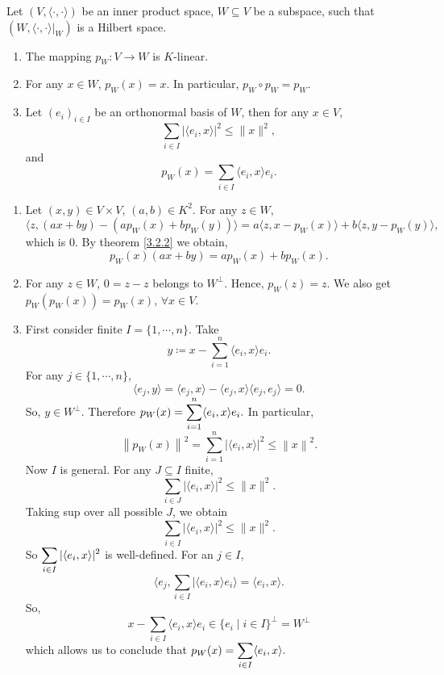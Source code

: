 \begin{propositionenv}[Parseval]\label{prop:3.2.7}
    Let $\left(V,\langle \cdot, \cdot\rangle\right)$ be an inner product space, $W\subseteq V$ be a subspace, such that $\left(W,\langle\cdot,\cdot\rangle|_W\right)$ is a Hilbert space.
    \begin{enumerate}
        \item The mapping $p_W : V\rightarrow W$ is $K$-linear.
        \item For any $x\in W$, $p_W(x) = x$. In particular, $p_W\circ p_W = p_W$.
        \item Let $\left(e_i\right)_{i\in I}$ be an orthonormal basis of $W$, then for any $x\in V$,
        $$ \sum_{i\in I} |\langle e_i, x\rangle|^2 \le \| x\|^2,$$
        and 
        $$ p_W(x) = \sum_{i\in I} \langle e_i, x\rangle e_i.$$
    \end{enumerate}
\end{propositionenv}
\begin{proofenv}
    \quad
    \begin{enumerate}
        \item Let $(x,y)\in V\times V$, $(a,b)\in K^2$. For any $z\in W$,
        $$ \langle z,\left(ax +by\right) - \left(a p_W(x) + bp_W(y)\right)\rangle = a\langle z, x - p_W(x)\rangle + b\langle z, y - p_W(y)\rangle,$$
        which is $0$. By theorem \ref{3.2.2} we obtain,
        $$p_W(x) (ax + by) = ap_W(x) + bp_W(x).$$
        \item For any $z\in W$, $0 = z-z$ belongs to $W^\perp$. Hence, $p_W(z) = z$.
        We also get $p_W(p_W(x)) = p_W(x)$, $\forall x\in V$.
        \item First consider finite $I=\{1,\cdots,n\}$. Take
        $$ y\coloneq x - \sum_{i=1}^{n} \langle e_i , x\rangle e_i.$$
        For any $j \in \{1,\cdots ,n\}$,
        $$ \langle e_j,y \rangle = \langle e_j, x\rangle - \langle e_j, x\rangle \langle e_j,e_j\rangle = 0.$$
        So, $y\in W^\perp$. Therefore $\displaystyle p_W(x) = \sum_{i=1}^{n} \langle e_i,x\rangle e_i.$
        In particular,
        $$ \left\| p_W(x)\right\|^2 = \sum_{i=1}^{n} \left|\langle e_i,x\rangle\right|^2 \le \left\|x\right\|^2.$$
        Now $I$ is general. For any $J\subseteq I$ finite,
        $$ \sum_{i\in J} |\langle e_i,x\rangle|^2 \le \|x\|^2.$$
        Taking sup over all possible $J$, we obtain
        $$ \sum_{i\in I} |\langle e_i,x\rangle|^2 \le \|x\|^2.$$
        So $\displaystyle \sum_{i\in I} |\langle e_i,x\rangle|^2 $ is well-defined.
        For an $j\in I$, 
        $$ \langle e_j,\sum_{i\in I} |\langle e_i,x\rangle e_i\rangle = \langle e_i,x\rangle.$$
        So, 
        $$ x - \sum_{i\in I} \langle e_i, x\rangle e_i \in \{e_i \mid i\in I\}^\perp = W^\perp$$
        which allows us to conclude that $\displaystyle p_W(x) = \sum_{i\in I} \langle e_i,x\rangle.$
    \end{enumerate}
\end{proofenv}

